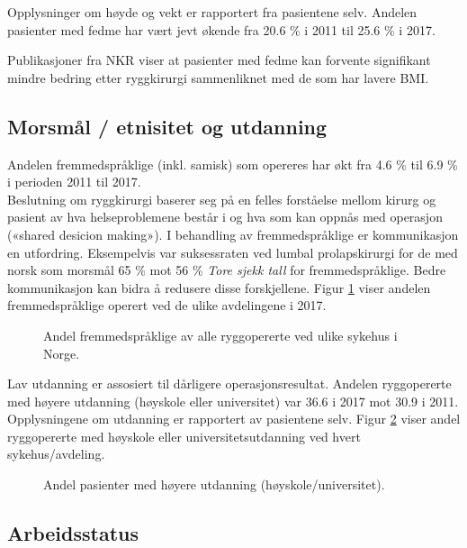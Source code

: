 \documentclass [norsk,a4paper,twoside]{article}\usepackage[]{graphicx}\usepackage[]{color}
\begin{document}
Opplysninger om høyde og vekt er rapportert fra pasientene selv.
Andelen pasienter med fedme har vært jevt økende fra 
20.6 \% 
i 2011
til 25.6 \%
i  2017.

Publikasjoner fra NKR viser at pasienter med fedme kan forvente signifikant mindre bedring etter 
ryggkirurgi sammenliknet med de som har lavere BMI. 




\subsection{Morsmål / etnisitet og utdanning}



Andelen fremmedspråklige (inkl. samisk) som opereres har økt fra 4.6 \% til 6.9 \% i perioden 2011 til 2017.\\
Beslutning om ryggkirurgi baserer seg på en felles forståelse mellom kirurg og
pasient av hva helseproblemene består i og hva som kan oppnås med operasjon
(«shared desicion making»). I behandling av fremmedspråklige er kommunikasjon
en utfordring. Eksempelvis var suksessraten ved lumbal prolapskirurgi for de med norsk som morsmål 65 \% mot 56 \% 
\textit{Tore sjekk tall} 
for fremmedspråklige. Bedre kommunikasjon kan bidra å redusere disse
forskjellene. Figur \ref{fig:Morsmal} viser andelen fremmedspråklige operert ved de ulike avdelingene i 2017.

\begin{figure}[ht]
\caption{\label{fig:Morsmal} Andel fremmedspråklige av alle ryggopererte ved ulike sykehus i
Norge.}
\end{figure}




Lav utdanning er assosiert til dårligere operasjonsresultat. Andelen ryggopererte med høyere utdanning (høyskole eller universitet) var 36.6 i 2017 mot  30.9 i 2011. 
Opplysningene om utdanning er rapportert av pasientene selv. 
Figur \ref{fig:HoyUtdAvd} viser andel ryggopererte 
med høyskole eller universitetsutdanning ved hvert sykehus/avdeling.


\begin{figure}[ht]
\caption{\label{fig:HoyUtdAvd} Andel pasienter med høyere utdanning (høyskole/universitet).}
\end{figure}


\clearpage

\subsection{Arbeidsstatus}
\end{document}
